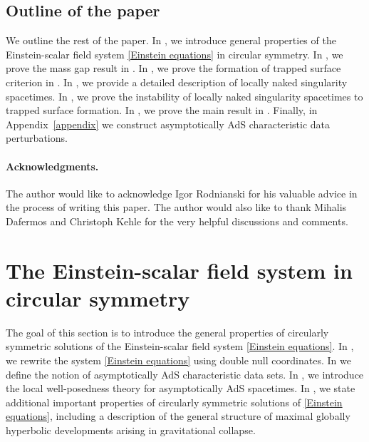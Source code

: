 \documentclass[11pt]{article}
\numberwithin{equation}{section}
\begin{document}
\subsection{Outline of the paper}\label{outline section}
We outline the rest of the paper. In , we introduce general properties of the Einstein-scalar field system \eqref{Einstein equations} in circular symmetry. In , we prove the mass gap result in . In , we prove the formation of trapped surface criterion in . In , we provide a detailed description of locally naked singularity spacetimes. In , we prove the instability of locally naked singularity spacetimes to trapped surface formation. In , we prove the main result in . Finally, in Appendix~\ref{appendix} we construct asymptotically AdS characteristic data perturbations.

\paragraph{Acknowledgments.} The author would like to acknowledge Igor Rodnianski for his valuable advice in the process of writing this paper. The author would also like to thank Mihalis Dafermos and Christoph Kehle for the very helpful discussions and comments.

\section{The Einstein-scalar field system in circular symmetry}\label{set up section}

The goal of this section is to introduce the general properties of circularly symmetric solutions of the Einstein-scalar field system \eqref{Einstein equations}. In , we rewrite the system \eqref{Einstein equations} using double null coordinates. In  we define the notion of asymptotically AdS characteristic data sets. In , we introduce the local well-posedness theory for asymptotically AdS spacetimes. In , we state additional important properties of circularly symmetric solutions of \eqref{Einstein equations}, including a description of the general structure of maximal globally hyperbolic developments arising in gravitational collapse.
\end{document}
